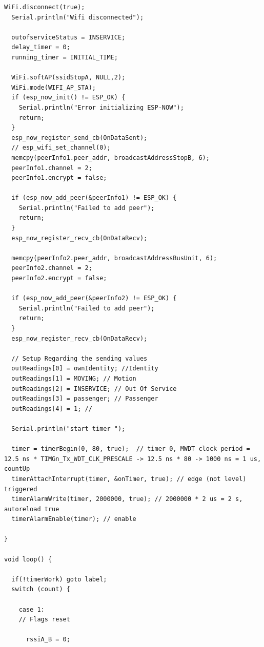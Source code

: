 \documentclass[12pt]{article} %
\begin{document}
\begin{lstlisting}[style=myArduino]
  WiFi.disconnect(true);
  Serial.println("Wifi disconnected");

  outofserviceStatus = INSERVICE;
  delay_timer = 0;
  running_timer = INITIAL_TIME;

  WiFi.softAP(ssidStopA, NULL,2);
  WiFi.mode(WIFI_AP_STA);
  if (esp_now_init() != ESP_OK) {
    Serial.println("Error initializing ESP-NOW");
    return;
  }
  esp_now_register_send_cb(OnDataSent);
  // esp_wifi_set_channel(0);
  memcpy(peerInfo1.peer_addr, broadcastAddressStopB, 6);
  peerInfo1.channel = 2;  
  peerInfo1.encrypt = false;
  
  if (esp_now_add_peer(&peerInfo1) != ESP_OK) {
    Serial.println("Failed to add peer");
    return;
  }
  esp_now_register_recv_cb(OnDataRecv);

  memcpy(peerInfo2.peer_addr, broadcastAddressBusUnit, 6);
  peerInfo2.channel = 2;  
  peerInfo2.encrypt = false;
  
  if (esp_now_add_peer(&peerInfo2) != ESP_OK) {
    Serial.println("Failed to add peer");
    return;
  }
  esp_now_register_recv_cb(OnDataRecv);

  // Setup Regarding the sending values
  outReadings[0] = ownIdentity; //Identity
  outReadings[1] = MOVING; // Motion
  outReadings[2] = INSERVICE; // Out Of Service 
  outReadings[3] = passenger; // Passenger
  outReadings[4] = 1; // 

  Serial.println("start timer ");

  timer = timerBegin(0, 80, true);  // timer 0, MWDT clock period = 12.5 ns * TIMGn_Tx_WDT_CLK_PRESCALE -> 12.5 ns * 80 -> 1000 ns = 1 us, countUp
  timerAttachInterrupt(timer, &onTimer, true); // edge (not level) triggered 
  timerAlarmWrite(timer, 2000000, true); // 2000000 * 2 us = 2 s, autoreload true
  timerAlarmEnable(timer); // enable

}

void loop() {
  
  if(!timerWork) goto label;
  switch (count) {

    case 1:
    // Flags reset
    
      rssiA_B = 0;


\end{lstlisting}
\end{document}
